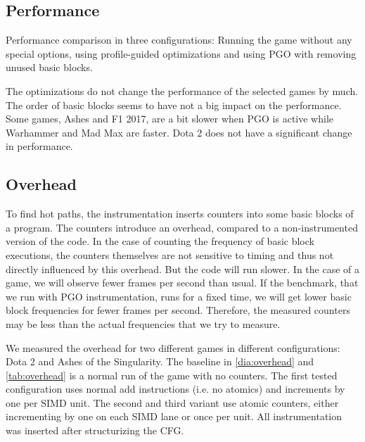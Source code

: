 \subsection{Performance}
\label{sub:eval_perf}
Performance comparison in three configurations: Running the game without any special options, using profile-guided optimizations and using PGO with removing unused basic blocks.

The optimizations do not change the performance of the selected games by much.
The order of basic blocks seems to have not a big impact on the performance.
Some games, Ashes and F1 2017, are a bit slower when PGO is active while Warhammer and Mad Max are faster.
Dota 2 does not have a significant change in performance.



\begin{table}
	\centering
	\label{tab:performance}
\end{table}

\subsection{Overhead}
\label{sub:overhead}
To find hot paths, the instrumentation inserts counters into some basic blocks of a program. The counters introduce an overhead, compared to a non-instrumented version of the code.
In the case of counting the frequency of basic block executions, the counters themselves are not sensitive to timing and thus not directly influenced by this overhead.
But the code will run slower. In the case of a game, we will observe fewer frames per second than usual.
If the benchmark, that we run with PGO instrumentation, runs for a fixed time, we will get lower basic block frequencies for fewer frames per second.
Therefore, the measured counters may be less than the actual frequencies that we try to measure.

We measured the overhead for two different games in different configurations: Dota 2 and Ashes of the Singularity. The baseline in \cref{dia:overhead} and \cref{tab:overhead} is a normal run of the game with no counters.
The first tested configuration uses normal add instructions (i.e. no atomics) and increments by one per SIMD unit.
The second and third variant use atomic counters, either incrementing by one on each SIMD lane or once per unit.
All instrumentation was inserted after structurizing the CFG.

